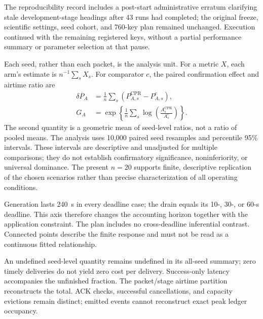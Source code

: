 The reproducibility record includes a post-start administrative erratum
clarifying stale development-stage headings after 43 runs had completed;
the original freeze, scientific settings, seed cohort, and 760-key plan
remained unchanged. Execution continued with the remaining registered keys,
without a partial performance summary or parameter selection at that pause.

Each seed, rather than each packet, is the analysis unit. For a metric
$X$, each arm's estimate is $n^{-1}\sum_s X_s$. For comparator $c$,
the paired confirmation effect and airtime ratio are
\begin{equation}
\begin{aligned}
\overline{\delta P_A}&=\frac{1}{n}\sum_s
 (P_{A,s}^{\mathrm{CPR}}-P_{A,s}^{c}),\\
G_A&=\exp\left\{\frac{1}{n}\sum_s
\log\left(\frac{A_s^{\mathrm{CPR}}}{A_s^c}\right)\right\}.
\end{aligned}
\label{eq:paired}
\end{equation}
The second quantity is a geometric mean of seed-level ratios, not a ratio
of pooled means. The analysis uses 10,000 paired seed resamples and
percentile 95\% intervals. These intervals are descriptive and unadjusted
for multiple comparisons; they do not establish confirmatory significance,
noninferiority, or universal dominance. The present $n=20$ supports finite,
descriptive replication of the chosen scenarios rather than precise
characterization of all operating conditions.

Generation lasts 240~s in every deadline case; the drain equals its
10-, 30-, or 60-s deadline. This axis therefore changes the accounting
horizon together with the application constraint. The plan includes no
cross-deadline inferential contrast. Connected points describe the finite
response and must not be read as a continuous fitted relationship.

An undefined seed-level quantity remains undefined in its all-seed
summary; zero timely deliveries do not yield zero cost per delivery.
Success-only latency accompanies the unfinished fraction. The packet/stage
airtime partition reconstructs the total. ACK checks, successful
cancellations, and capacity evictions remain distinct; emitted events
cannot reconstruct exact peak ledger occupancy.
